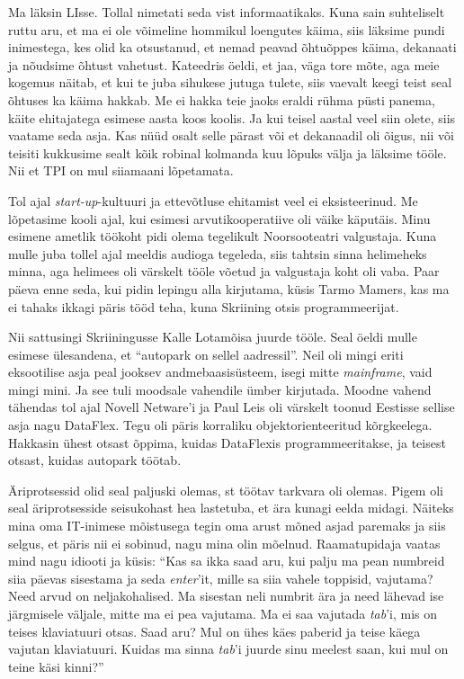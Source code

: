 Ma läksin LIsse. Tollal nimetati seda vist informaatikaks. 
Kuna sain suhteliselt ruttu aru, et ma ei ole võimeline hommikul loengutes 
käima, siis läksime pundi inimestega, kes olid ka otsustanud, et nemad 
peavad õhtuõppes käima, dekanaati ja nõudsime õhtust vahetust. Kateedris öeldi, 
et jaa, väga tore mõte, aga 
meie kogemus näitab, et kui te juba sihukese jutuga tulete, siis vaevalt keegi 
teist seal õhtuses ka käima hakkab. Me ei hakka teie jaoks  
eraldi rühma püsti panema, käite ehitajatega esimese aasta koos koolis. Ja kui 
teisel aastal veel siin olete, siis vaatame seda asja. Kas nüüd osalt selle 
pärast või et dekanaadil oli õigus, nii või teisiti kukkusime 
sealt kõik robinal kolmanda kuu lõpuks välja ja läksime tööle. Nii 
et TPI on mul siiamaani lõpetamata. 


Tol ajal \emph{start-up}-kultuuri ja ettevõtluse ehitamist veel ei 
eksisteerinud. Me lõpetasime kooli ajal, kui esimesi 
arvutikooperatiive oli väike käputäis. Minu esimene ametlik töökoht pidi 
olema tegelikult Noorsooteatri valgustaja. Kuna mulle juba 
tollel ajal meeldis audioga tegeleda, siis tahtsin sinna helimeheks minna, 
aga helimees oli värskelt tööle võetud ja valgustaja koht oli vaba. Paar päeva 
enne seda, kui pidin lepingu alla kirjutama, 
küsis Tarmo Mamers, kas ma ei tahaks ikkagi päris 
tööd teha, kuna Skriining otsis programmeerijat. 

Nii sattusingi Skriiningusse Kalle Lotamõisa juurde 
tööle. Seal öeldi mulle esimese ülesandena, et \enquote{autopark on sellel 
aadressil}. 
Neil oli mingi eriti eksootilise asja peal jooksev andmebaasisüsteem, 
isegi mitte \emph{mainframe}, vaid mingi mini. Ja see tuli 
moodsale vahendile ümber kirjutada. Moodne vahend tähendas tol ajal Novell 
Netware'i ja Paul Leis oli värskelt toonud 
Eestisse sellise asja nagu DataFlex. Tegu oli päris 
 korraliku objektorienteeritud kõrgkeelega. Hakkasin ühest otsast õppima, 
kuidas DataFlexis programmeeritakse, ja 
teisest otsast, kuidas autopark töötab. 


Äriprotsessid olid seal paljuski olemas, st töötav tarkvara 
oli olemas. Pigem oli seal äriprotsesside seisukohast hea lastetuba, et ära 
kunagi eelda midagi. Näiteks mina oma IT-inimese mõistusega tegin oma 
arust mõned asjad paremaks ja siis selgus, et päris nii ei sobinud, nagu 
mina olin mõelnud. Raamatupidaja vaatas mind nagu idiooti ja küsis: 
\enquote{Kas sa ikka saad aru, kui palju ma pean numbreid siia päevas sisestama 
ja seda \emph{enter}'it, mille sa siia vahele toppisid, vajutama? Need arvud 
on neljakohalised. Ma sisestan neli numbrit ära ja 
need lähevad ise järgmisele väljale, mitte ma ei pea vajutama. Ma ei saa
vajutada \emph{tab}'i, mis on teises klaviatuuri otsas. Saad aru? Mul on ühes 
käes
paberid ja teise käega vajutan klaviatuuri. Kuidas ma sinna \emph{tab}'i juurde 
sinu 
meelest saan, kui mul on teine käsi kinni?} 

